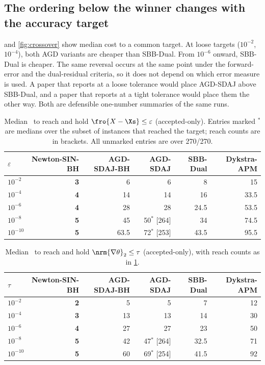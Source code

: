 \subsection{The ordering below the winner changes with the accuracy target}
 and \cref{fig:crossover} show median cost to a common
target. At loose targets ($10^{-2}$, $10^{-4}$), both AGD variants are cheaper
than SBB-Dual. From $10^{-6}$ onward, SBB-Dual is cheaper. The same reversal
occurs at the same point under the forward-error and the dual-residual
criteria, so it does not depend on which error measure is used. A paper that
reports at a loose tolerance would place AGD-SDAJ above SBB-Dual, and a paper
that reports at a tight tolerance would place them the other way. Both are
defensible one-number summaries of the same runs.



\begin{table}[t]
\centering
\caption{Median \EVDs\ to reach and hold $\fro{X-\Xs}\le\varepsilon$
(accepted-only). Entries marked $^{*}$ are medians over the subset of
instances that reached the target; reach counts are in brackets. All
unmarked entries are over 270/270.}
\label{tab:fwd}
\begin{tabular}{lrrrrr}
\toprule
$\varepsilon$ & Newton-SIN-BH & AGD-SDAJ-BH & AGD-SDAJ & SBB-Dual & Dykstra-APM\\
\midrule
$10^{-2}$  & \textbf{3} & 6 & 6 & 8 & 15\\
$10^{-4}$  & \textbf{4} & 14 & 14 & 16 & 33.5\\
$10^{-6}$  & \textbf{4} & 28 & 28 & 24.5 & 53.5\\
$10^{-8}$  & \textbf{5} & 45 & 50$^{*}$ [264] & 34 & 74.5\\
$10^{-10}$ & \textbf{5} & 63.5 & 72$^{*}$ [253] & 43.5 & 95.5\\
\bottomrule
\end{tabular}
\end{table}

\begin{table}[t]
\centering
\caption{Median \EVDs\ to reach and hold $\nrm{\nabla\theta}_2\le\tau$
(accepted-only), with reach counts as in \cref{tab:fwd}.}
\label{tab:res}
\begin{tabular}{lrrrrr}
\toprule
$\tau$ & Newton-SIN-BH & AGD-SDAJ-BH & AGD-SDAJ & SBB-Dual & Dykstra-APM\\
\midrule
$10^{-2}$  & \textbf{2} & 5 & 5 & 7 & 12\\
$10^{-4}$  & \textbf{3} & 13 & 13 & 14 & 30\\
$10^{-6}$  & \textbf{4} & 27 & 27 & 23 & 50\\
$10^{-8}$  & \textbf{5} & 42 & 47$^{*}$ [264] & 32.5 & 71\\
$10^{-10}$ & \textbf{5} & 60 & 69$^{*}$ [254] & 41.5 & 92\\
\bottomrule
\end{tabular}
\end{table}

